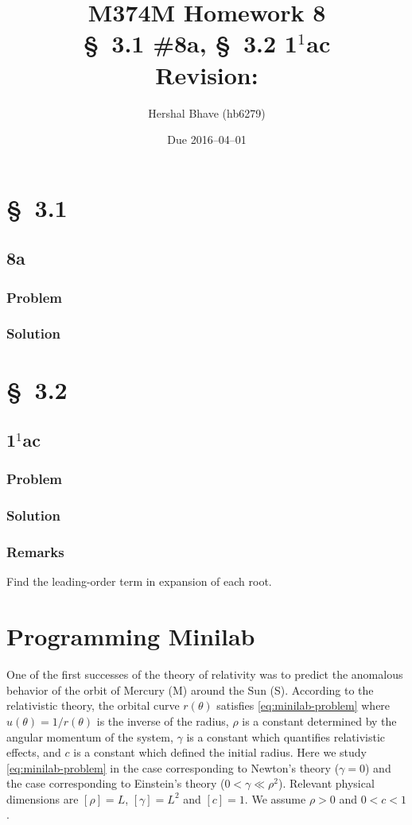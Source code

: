 \documentclass[12pt]{article}
\title{M374M Homework 8 \\
  \normalsize{\S~3.1 \#8a, \S~3.2 1$^1$ac} \\
  Revision: }
\author{Hershal Bhave (hb6279)}
\date{Due 2016--04--01}
\begin{document}
\maketitle

\section{\S~3.1}
\subsection{8a}
\subsubsection*{Problem}
\subsubsection*{Solution}

\section{\S~3.2}
\subsection{1$^1$ac}
\subsubsection*{Problem}
\subsubsection*{Solution}
\subsubsection*{Remarks}
Find the leading-order term in expansion of each root.

\section{Programming Minilab}
One of the first successes of the theory of relativity was to predict the
anomalous behavior of the orbit of Mercury (M) around the Sun (S). According to
the relativistic theory, the orbital curve $r(\theta)$ satisfies
\cref{eq:minilab-problem} where $u(\theta)=1/r(\theta)$ is the inverse of the
radius, $\rho$ is a constant determined by the angular momentum of the system,
$\gamma$ is a constant which quantifies relativistic effects, and $c$ is a
constant which defined the initial radius. Here we study
\cref{eq:minilab-problem} in the case corresponding to Newton's theory
($\gamma=0$) and the case corresponding to Einstein's theory
($0<\gamma\ll\rho^2$). Relevant physical dimensions are $[\rho]=L$,
$[\gamma]=L^2$ and $[c]=1$. We assume $\rho>0$ and $0<c<1$.
\end{document}
